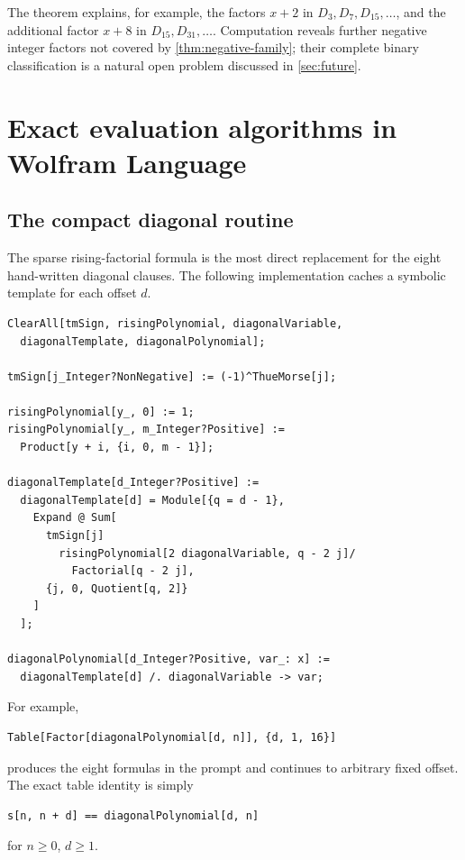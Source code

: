\documentclass[11pt]{article}
\theoremstyle{definition}
\theoremstyle{remark}
\newcommand{\Diag}{D}
\begin{document}
The theorem explains, for example, the factors \(x+2\) in
\(\Diag_3,\Diag_7,\Diag_{15},\ldots\), and the additional factor
\(x+8\) in \(\Diag_{15},\Diag_{31},\ldots\).  Computation reveals further
negative integer factors not covered by \cref{thm:negative-family}; their
complete binary classification is a natural open problem discussed in
\cref{sec:future}.

\section{Exact evaluation algorithms in Wolfram Language}

\subsection{The compact diagonal routine}

The sparse rising-factorial formula is the most direct replacement for the
eight hand-written diagonal clauses.  The following implementation caches a
symbolic template for each offset \(d\).

\begin{lstlisting}[language=Wolfram,caption={General diagonal polynomial.}]
ClearAll[tmSign, risingPolynomial, diagonalVariable,
  diagonalTemplate, diagonalPolynomial];

tmSign[j_Integer?NonNegative] := (-1)^ThueMorse[j];

risingPolynomial[y_, 0] := 1;
risingPolynomial[y_, m_Integer?Positive] :=
  Product[y + i, {i, 0, m - 1}];

diagonalTemplate[d_Integer?Positive] :=
  diagonalTemplate[d] = Module[{q = d - 1},
    Expand @ Sum[
      tmSign[j]
        risingPolynomial[2 diagonalVariable, q - 2 j]/
          Factorial[q - 2 j],
      {j, 0, Quotient[q, 2]}
    ]
  ];

diagonalPolynomial[d_Integer?Positive, var_: x] :=
  diagonalTemplate[d] /. diagonalVariable -> var;
\end{lstlisting}

For example,
\begin{lstlisting}[language=Wolfram]
Table[Factor[diagonalPolynomial[d, n]], {d, 1, 16}]
\end{lstlisting}
produces the eight formulas in the prompt and continues to arbitrary fixed
offset.  The exact table identity is simply
\begin{lstlisting}[language=Wolfram]
s[n, n + d] == diagonalPolynomial[d, n]
\end{lstlisting}
for \(n\geq0\), \(d\geq1\).
\end{document}
